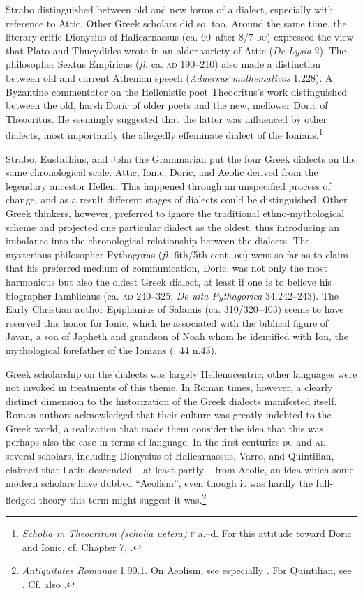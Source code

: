 Strabo distinguished between old and new forms of a dialect, especially with reference to Attic. Other Greek scholars did so, too. Around the same time, the literary critic Dionysius of Halicarnassus (ca. 60–after 8/7 \textsc{bc}) expressed the view that Plato and Thucydides wrote in an older variety of Attic (\textit{De Lysia} 2). The philosopher Sextus Empiricus (\textit{fl.} ca. \textsc{ad} 190–210) also made a distinction between old and current Athenian speech (\textit{Aduersus mathematicos} 1.228). A Byzantine commentator on the Hellenistic poet Theocritus’s work distinguished between the old, harsh Doric of older poets and the new, mellower Doric of Theocritus. He seemingly suggested that the latter was influenced by other dialects, most importantly the allegedly effeminate dialect of the Ionians.\footnote{\textit{Scholia in Theocritum (scholia uetera)} \textsc{f} a.–d. For this attitude toward Doric and Ionic, cf. Chapter 7, .}

Strabo, Eustathius, and John the Grammarian put the four Greek dialects on the same chronological scale. Attic, Ionic, Doric, and Aeolic derived from the legendary ancestor Hellen. This happened through an unspecified process of change, and as a result different stages of dialects could be distinguished. Other Greek thinkers, however, preferred to ignore the traditional ethno-mythological scheme and projected one particular dialect as the oldest, thus introducing an imbalance into the chronological relationship between the dialects. The mysterious philosopher Pythagoras (\textit{fl.} 6th/5th cent. \textsc{bc}) went so far as to claim that his preferred medium of communication, Doric, was not only the most harmonious but also the oldest Greek dialect, at least if one is to believe his biographer Iamblichus (ca. \textsc{ad} 240–325; \textit{De uita Pythagorica} 34.242–243). The Early Christian author Epiphanius of Salamis (ca. 310/320–403) seems to have reserved this honor for Ionic, which he associated with the biblical figure of Javan, a son of Japheth and grandson of Noah whom he identified with Ion, the mythological forefather of the Ionians (\citealt{VanRooy2013}: 44 n.43).

Greek scholarship on the dialects was largely Hellenocentric; other languages were not invoked in treatments of this theme. In Roman times, however, a clearly distinct dimension to the historization of the Greek dialects manifested itself. Roman authors acknowledged that their culture was greatly indebted to the Greek world, a realization that made them consider the idea that this was perhaps also the case in terms of language. In the first centuries \textsc{bc} and \textsc{ad}, several scholars, including Dionysius of Halicarnassus, Varro, and Quintilian, claimed that Latin descended – at least partly – from Aeolic, an idea which some modern scholars have dubbed “Aeolism”, even though it was hardly the full-fledged theory this term might suggest it was.\footnote{\textit{Antiquitates Romanae} 1.90.1. On Aeolism, see especially \citet[]{Stevens2006}. For Quintilian, see \citet[149]{Fogen2000}. Cf. also \citet[117--119]{Schopsdau1992}.}


